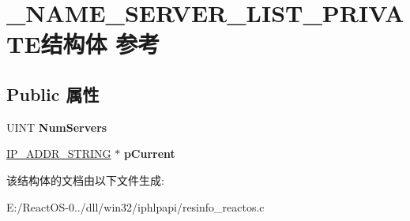 \hypertarget{struct___n_a_m_e___s_e_r_v_e_r___l_i_s_t___p_r_i_v_a_t_e}{}\section{\+\_\+\+N\+A\+M\+E\+\_\+\+S\+E\+R\+V\+E\+R\+\_\+\+L\+I\+S\+T\+\_\+\+P\+R\+I\+V\+A\+T\+E结构体 参考}
\label{struct___n_a_m_e___s_e_r_v_e_r___l_i_s_t___p_r_i_v_a_t_e}
\subsection*{Public 属性}
\begin{DoxyCompactItemize}
\item 
\mbox{\label{struct___n_a_m_e___s_e_r_v_e_r___l_i_s_t___p_r_i_v_a_t_e_aa2307d312bf72614362a4443c4ccd90f}} 
U\+I\+NT {\bfseries Num\+Servers}
\item 
\mbox{\label{struct___n_a_m_e___s_e_r_v_e_r___l_i_s_t___p_r_i_v_a_t_e_aeae6266a8deb8da97c3c51fd53a091fc}} 
\hyperlink{struct___i_p___a_d_d_r___s_t_r_i_n_g}{I\+P\+\_\+\+A\+D\+D\+R\+\_\+\+S\+T\+R\+I\+NG} $\ast$ {\bfseries p\+Current}
\end{DoxyCompactItemize}


该结构体的文档由以下文件生成\+:\begin{DoxyCompactItemize}
\item 
E\+:/\+React\+O\+S-\/0../dll/win32/iphlpapi/resinfo\+\_\+reactos.\+c\end{DoxyCompactItemize}
